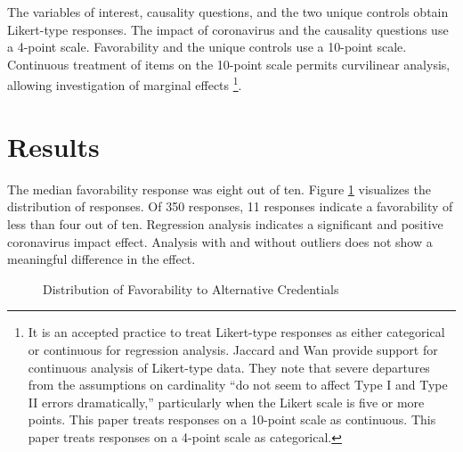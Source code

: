 The variables of interest,
causality questions,
and the two unique controls obtain Likert-type responses.
The impact of coronavirus and the causality questions use a 4-point scale.
Favorability and the unique controls use a 10-point scale.
Continuous treatment of items on the 10-point scale permits curvilinear analysis,
allowing investigation of marginal effects
\footnote{
    It is an accepted practice to treat Likert-type responses as either categorical or continuous for regression analysis.
    Jaccard and Wan provide support for continuous analysis of Likert-type data.
    They note that severe departures from the assumptions on cardinality ``do not seem to affect Type I and Type II errors dramatically,''
    particularly when the Likert scale is five or more points\cite{jaccard1996lisrel}.
    This paper treats responses on a 10-point scale as continuous.
    This paper treats responses on a 4-point scale as categorical.
}.

\section{Results}

The median favorability response was eight out of ten.
Figure \ref{fig:one} visualizes the distribution of responses.
Of 350 responses, 11 responses indicate a favorability of less than four out of ten.
Regression analysis indicates a significant and positive coronavirus impact effect.
Analysis with and without outliers does not show a meaningful difference in the effect.

\begin{figure}[h!]
    \centering
    \caption{Distribution of Favorability to Alternative Credentials}
    \figSpace
    \label{fig:one}

\end{figure}

